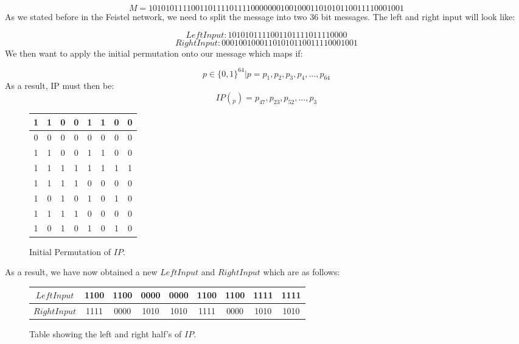 \documentclass[11pt,a4paper, notitlepage]{report}
\begin{document}
\begin{displaymath}
M = 1010 1011 1100 1101 1110 1111 0000 0001 0010 0011 0101 0110 0111 1000 1001
\end{displaymath}
As we stated before in the Feistel network, we need to split the message into two 36 bit messages. The left and right input will look like:

\begin{displaymath}
Left Input: 1010 1011 1100 1101 1110 1111 0000
\end{displaymath}
\begin{displaymath}
Right Input: 0001 0010 0011 0101 0110 0111 1000 1001
\end{displaymath}
We then want to apply the initial permutation onto our message which maps if:

\begin{displaymath}
p \in \{0,1\}^{64} | p = p_{1}, p_{2}, p_{3}, p_{4},...,p_{64}
\end{displaymath}
As a result, IP must then be:
\begin{displaymath}
IP(_{p}) = p_{47}, p_{23}, p_{52},...,p_{3}
\end{displaymath}


\begin{figure}[H]
\centering
\label{tab:Iperm}
\begin{tabular}{ |c|c|c|c|c|c|c|c| }
\hline
1 & 1 & 0 & 0 & 1 & 1 & 0 & 0\\ \hline
0 & 0 & 0 & 0 & 0 & 0 & 0 & 0\\ \hline
1 & 1 & 0 & 0 & 1 & 1 & 0 & 0\\ \hline
1 & 1 & 1 & 1 & 1 & 1 & 1 & 1\\ \hline
1 & 1 & 1 & 1 & 0 & 0 & 0 & 0\\ \hline
1 & 0 & 1 & 0 & 1 & 0 & 1 & 0\\ \hline
1 & 1 & 1 & 1 & 0 & 0 & 0 & 0\\ \hline
1 & 0 & 1 & 0 & 1 & 0 & 1 & 0\\ \hline
\end{tabular}
\caption{Initial Permutation of $IP$.}
\end{figure}
As a result, we have now obtained a new $LeftInput$ and $RightInput$ which are as follows:

\begin{figure}[H]
\centering
\label{tab:LeftRight}
\begin{tabular}{|c|c|c|c|c|c|c|c|c|}
\hline
$LeftInput$ & 1100 & 1100 & 0000 & 0000 & 1100 & 1100 & 1111 & 1111\\ \hline
$RightInput$ & 1111 & 0000 & 1010 & 1010 & 1111 & 0000 & 1010 & 1010\\ \hline
\end{tabular}
\caption{Table showing the left and right half's of $IP$.}
\end{figure}
\end{document}
